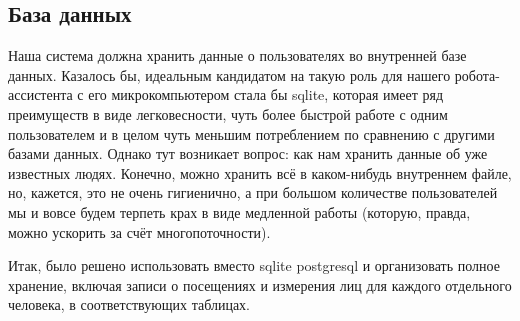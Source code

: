 \documentclass[a4paper,hidelinks,14pt]{extarticle}
\begin{document}
	\subsection{База данных}
	Наша система должна хранить данные о пользователях во внутренней базе данных. Казалось бы, идеальным кандидатом на такую роль для нашего робота-ассистента с его микрокомпьютером стала бы sqlite, которая имеет ряд преимуществ в виде легковесности, чуть более быстрой работе с одним пользователем и в целом чуть меньшим потреблением по сравнению с другими базами данных. Однако тут возникает вопрос: как нам хранить данные об уже известных людях. Конечно, можно хранить всё в каком-нибудь внутреннем файле, но, кажется, это не очень гигиенично, а при большом количестве пользователей мы и вовсе будем терпеть крах в виде медленной работы (которую, правда, можно ускорить за счёт многопоточности).
	
	Итак, было решено использовать вместо sqlite postgresql и организовать полное хранение, включая записи о посещениях и измерения лиц для каждого отдельного человека, в соответствующих таблицах.
	
\end{document}
